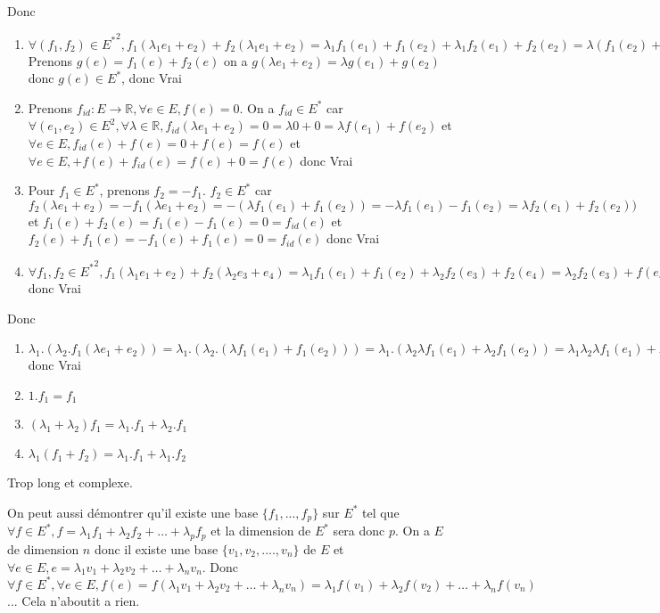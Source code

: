 \documentclass[]{book}
\theoremstyle{definition}
\newcommand{\bb}[1]{\mathbb{#1}}
\newcommand{\R}{\bb{R}}
\begin{document}
Donc
\begin{enumerate}
\item $\forall (f_1, f_2) \in {E^{*}}^2, f_1(\lambda_1 e_1 + e_2) + f_2(\lambda_1 e_1 + e_2) =  \lambda_1 f_1(e_1) + f_1(e_2) + \lambda_1 f_2(e_1) + f_2(e_2) = \lambda(f_1(e_2) + f_2(e_1)) + (f_1(e_2) + f_2(e_2))$ Prenons $g(e) = f_1(e) + f_2(e)$ on a $g(\lambda e_1 + e_2) = \lambda g(e_1) + g(e_2)$ donc $g(e) \in E^{*}$, donc Vrai
\item Prenons $f_{id} : E \to \R, \forall e \in E, f(e) = 0$. On a $f_{id} \in E^{*}$ car $\forall (e_1,e_2) \in E^2, \forall \lambda \in \R, f_{id}(\lambda e_1 + e_2) = 0 = \lambda 0 + 0 = \lambda f(e_1) + f(e_2)$ et $\forall e \in E, f_{id}(e) + f(e) = 0 + f(e) = f(e)$ et $\forall e \in E, + f(e) + f_{id}(e)= f(e) + 0 = f(e)$ donc Vrai
\item Pour $f_1 \in E^{*}$, prenons $f_2 = -f_1$. $f_2 \in E^{*}$ car $f_2(\lambda e_1 + e_2) = -f_1(\lambda e_1 + e_2) = -(\lambda f_1(e_1) + f_1(e_2)) = -\lambda f_1(e_1) - f_1(e_2) = \lambda f_2(e_1) + f_2(e_2))$ et $f_1(e) + f_2(e) = f_1(e) - f_1(e) = 0 = f_{id}(e)$ et $f_2(e) + f_1(e) = -f_1(e) + f_1(e) = 0 = f_{id}(e)$ donc Vrai
\item $\forall f_1, f_2 \in {E^{*}}^2, f_1(\lambda_1 e_1 + e_2) + f_2(\lambda_2 e_3 + e_4) = \lambda_1 f_1(e_1) + f_1(e_2) + \lambda_2 f_2(e_3) + f_2(e_4) =  \lambda_2 f_2(e_3) + f(e_4) + \lambda_1 f_1(e_1) + f_1(e_2) = f_2(\lambda_2 e_3 + e_4) + f_1(\lambda_1 e_1 + e_2)$ donc Vrai
\end{enumerate}


Donc
\begin {enumerate}
\item $\lambda_1.(\lambda_2 . f_1(\lambda e_1 + e_2)) = \lambda_1.(\lambda_2 . (\lambda f_1(e_1) + f_1(e_2))) = \lambda_1.( \lambda_2 \lambda f_1(e_1) + \lambda_2 f_1(e_2)) = \lambda_1 \lambda_2 \lambda f_1(e_1) + \lambda_1 \lambda_2 f_1(e_2) = (\lambda_1 \lambda_2) . (\lambda f_1(e_1) + f_1(e_2)) = (\lambda_1 \lambda_2) . f_1(\lambda e_1 + e_2))$ donc Vrai
\item $1 . f_1 = f_1$
\item $(\lambda_1 + \lambda_2) f_1 = \lambda_1 . f_1 + \lambda_2 . f_1 $
\item $\lambda_1 ( f_1 + f_2) = \lambda_1 . f_1 + \lambda_1 . f_2$
\end{enumerate}

Trop long et complexe. 


On peut aussi d\'emontrer qu'il existe une base $\{f_1, ..., f_p\}$ sur $E^{*}$ tel que $\forall f \in E^{*}, f = \lambda_1 f_1 + \lambda_2 f_2 + \ldots + \lambda_p f_p$ et la dimension de $E^{*}$ sera donc $p$. On a $E$ de dimension $n$ donc il existe une base $\{v_1, v_2, ...., v_n\}$ de $E$ et $\forall e \in E, e = \lambda_1 v_1 + \lambda_2 v_2 + \ldots + \lambda_n v_n$. Donc $\forall f \in E^{*}, \forall e \in E, f(e) = f(\lambda_1 v_1 + \lambda_2 v_2 + \ldots + \lambda_n v_n) = \lambda_1 f(v_1) + \lambda_2 f(v_2) + \ldots + \lambda_n f(v_n)$ ... Cela n'aboutit a rien.
\end{document}
